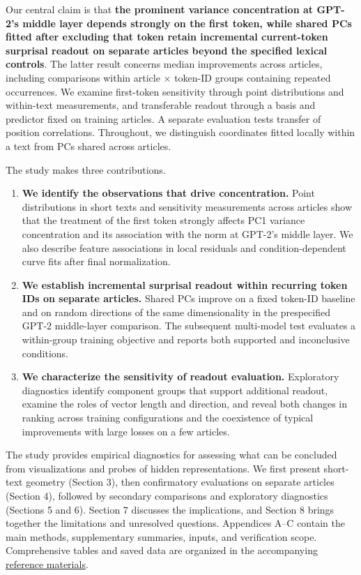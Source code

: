 Our central claim is that \textbf{the prominent variance concentration at GPT-2's middle layer depends strongly on the first token, while shared PCs fitted after excluding that token retain incremental current-token surprisal readout on separate articles beyond the specified lexical controls}. The latter result concerns median improvements across articles, including comparisons within article × token-ID groups containing repeated occurrences. We examine first-token sensitivity through point distributions and within-text measurements, and transferable readout through a basis and predictor fixed on training articles. A separate evaluation tests transfer of position correlations. Throughout, we distinguish coordinates fitted locally within a text from PCs shared across articles.

The study makes three contributions.

\begin{enumerate}
\def\labelenumi{\arabic{enumi}.}
\tightlist
\item
  \textbf{We identify the observations that drive concentration.} Point distributions in short texts and sensitivity measurements across articles show that the treatment of the first token strongly affects PC1 variance concentration and its association with the norm at GPT-2's middle layer. We also describe feature associations in local residuals and condition-dependent curve fits after final normalization.
\item
  \textbf{We establish incremental surprisal readout within recurring token IDs on separate articles.} Shared PCs improve on a fixed token-ID baseline and on random directions of the same dimensionality in the prespecified GPT-2 middle-layer comparison. The subsequent multi-model test evaluates a within-group training objective and reports both supported and inconclusive conditions.
\item
  \textbf{We characterize the sensitivity of readout evaluation.} Exploratory diagnostics identify component groups that support additional readout, examine the roles of vector length and direction, and reveal both changes in ranking across training configurations and the coexistence of typical improvements with large losses on a few articles.
\end{enumerate}

The study provides empirical diagnostics for assessing what can be concluded from visualizations and probes of hidden representations. We first present short-text geometry (Section 3), then confirmatory evaluations on separate articles (Section 4), followed by secondary comparisons and exploratory diagnostics (Sections 5 and 6). Section 7 discusses the implications, and Section 8 brings together the limitations and unresolved questions. Appendices A--C contain the main methods, supplementary summaries, inputs, and verification scope. Comprehensive tables and saved data are organized in the accompanying \href{https://github.com/metaSATOKEN/manifold_topology_experiment/blob/main/references/README.md}{reference materials}.

